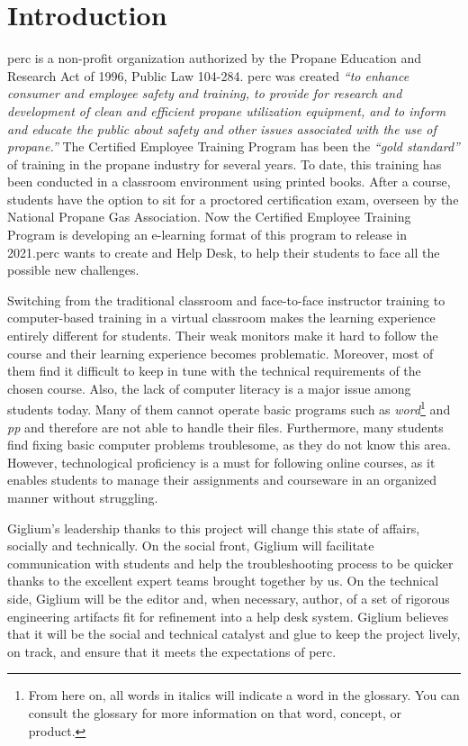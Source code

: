 \clearpage
{}
\section{Introduction}\label{introduction}
\gls{perc} is a non-profit organization
authorized by the Propane Education and Research Act of 1996, Public Law 104{-}284.
\gls{perc} was created \textit{“to enhance consumer and employee safety and training, to provide for research and development of clean and efficient propane utilization equipment, and to inform and
	educate the public about safety and other issues associated with the use of propane.”} The Certified Employee Training Program has been the \textit{“gold standard”} of training in the
propane industry for several years. To date, this training has been conducted in a classroom
environment using printed books. After a course, students have the option to sit
for a proctored certification exam, overseen by the National Propane Gas Association.
Now the Certified Employee Training Program is developing an e-learning format of this program to release in 2021.\gls{perc} wants to create and Help Desk, to help their students to face all the possible new challenges.

Switching from the traditional classroom and face-to-face instructor training to computer-based training in a virtual classroom makes the learning experience entirely different for students. Their weak monitors make it hard to follow the course and their learning experience becomes problematic. Moreover, most of them find it difficult to keep in tune with the technical requirements of the chosen course. Also, the lack of computer literacy is a major issue among students today. Many of them cannot operate basic programs such as \textit{\gls{word}}\footnote{From here on, all words in italics will indicate a word in the glossary. You can consult the glossary for more information on that word, concept, or product.} and \textit{\gls{pp}} and therefore are not able to handle their files. Furthermore, many students find fixing basic computer problems troublesome, as they do not know this area. However, technological proficiency is a must for following online courses, as it enables students to manage their assignments and courseware in an organized manner without struggling.

Giglium's leadership thanks to this project will change this state of affairs, socially and technically. On the social front, Giglium will facilitate communication with students and help the troubleshooting process to be quicker thanks to the excellent expert teams brought together by us. On the technical side, Giglium will be the editor and, when necessary, author, of a set of rigorous engineering artifacts fit for refinement into a help desk system. Giglium believes that it will be the social and technical catalyst and glue to keep the project lively, on track, and ensure that it meets the expectations of \gls{perc}.


